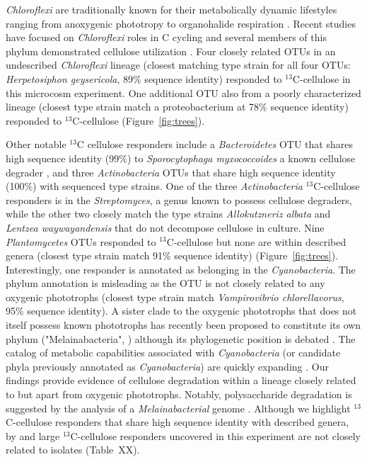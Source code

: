 \textit{Chloroflexi} are traditionally known for their metabolically dynamic
lifestyles ranging from anoxygenic phototropy to organohalide respiration
\citep{Hug_2013}. Recent studies have focused on \textit{Chloroflexi} roles in C
cycling \citep{Hug_2013, Goldfarb_2011,Cole_2013} and several members of this
phylum demonstrated cellulose utilization \citep{Goldfarb_2011, Cole_2013,
Hug_2013}. Four closely related OTUs in an undescribed \textit{Chloroflexi}
lineage (closest matching type strain for all four OTUs: \textit{Herpetosiphon
geysericola}, 89\% sequence identity) responded to $^{13}$C-cellulose in this
microcosm experiment. One additional OTU also from a poorly characterized
lineage (closest type strain match a proteobacterium at 78\% sequence identity)
responded to $^{13}$C-cellulose (Figure~\ref{fig:trees}).

Other notable $^{13}$C cellulose responders include a \textit{Bacteroidetes}
OTU that shares high sequence identity (99\%) to \textit{Sporocytophaga
myxococcoides} a known cellulose degrader \citep{Vance_1980}, and three
\textit{Actinobacteria} OTUs that share high sequence identity (100\%) with
sequenced type strains. One of the three \textit{Actinobacteria}
$^{13}$C-cellulose responders is in the \textit{Streptomyces}, a genus known to
possess cellulose degraders, while the other two closely match the type strains
\textit{Allokutzneriz albata} \citep{Labeda_2008, Tomita_1993} and
\textit{Lentzea waywayandensis} \citep{LABEDA_1989, Labeda_2001} that do not
decompose cellulose in culture. Nine \textit{Plantomycetes} OTUs responded to
$^{13}$C-cellulose but none are within described genera (closest type strain
match 91\% sequence identity) (Figure~\ref{fig:trees}). Interestingly, one
responder is annotated as belonging in the \textit{Cyanobacteria}. The phylum
annotation is misleading as the OTU is not closely related to any oxygenic
phototrophs (closest type strain match \textit{Vampirovibrio chlorellavorus},
95\% sequence identity). A sister clade to the oxygenic phototrophs that does
not itself possess known phototrophs has recently been proposed to constitute
its own phylum ("Melainabacteria", \citet{Di_Rienzi_2013}) although its
phylogenetic position is debated \citep{Soo_2014}. The catalog of metabolic
capabilities associated with \textit{Cyanobacteria} (or candidate phyla
previously annotated as \textit{Cyanobacteria}) are quickly expanding
\citep{Di_Rienzi_2013, Soo_2014}.  Our findings provide evidence of cellulose
degradation within a lineage closely related to but apart from oxygenic
phototrophs. Notably, polysaccharide degradation is suggested by the analysis
of a \textit{Melainabacterial} genome \citep{Di_Rienzi_2013}. Although we
highlight $^{13}$C-cellulose responders that share high sequence identity with
described genera, by and large $^{13}$C-cellulose responders uncovered in this
experiment are not closely related to isolates (Table~XX).

